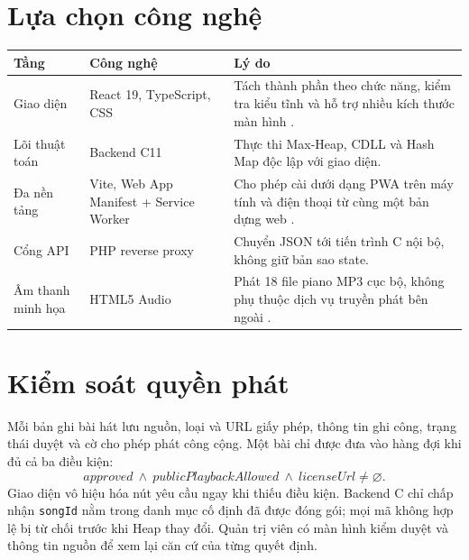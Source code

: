 \documentclass[12pt,a4paper,twoside,openright]{report}
\newcommand{\code}[1]{\texttt{#1}}
\begin{document}
\section{Lựa chọn công nghệ}
\begin{table}[h]\centering\small
\begin{tabularx}{\textwidth}{@{}p{3cm}p{3.6cm}X@{}}
\toprule
\textbf{Tầng} & \textbf{Công nghệ} & \textbf{Lý do}\\
\midrule
Giao diện & React 19, TypeScript, CSS & Tách thành phần theo chức năng, kiểm tra kiểu tĩnh
và hỗ trợ nhiều kích thước màn hình \cite{reactdocs}.\\
Lõi thuật toán & Backend C11 & Thực thi Max-Heap, CDLL và Hash Map độc lập với giao diện.\\
Đa nền tảng & Vite, Web App Manifest + Service Worker & Cho phép cài dưới dạng PWA trên
máy tính và điện thoại từ cùng một bản dựng web \cite{vitedocs}.\\
Cổng API & PHP reverse proxy & Chuyển JSON tới tiến trình C nội bộ, không giữ bản sao state.\\
Âm thanh minh họa & HTML5 Audio & Phát 18 file piano MP3 cục bộ, không phụ thuộc dịch vụ
truyền phát bên ngoài \cite{mdnaudio}.\\
\bottomrule
\end{tabularx}
\end{table}

\section{Kiểm soát quyền phát}
Mỗi bản ghi bài hát lưu nguồn, loại và URL giấy phép, thông tin ghi công, trạng thái duyệt
và cờ cho phép phát công cộng. Một bài chỉ
được đưa vào hàng đợi khi đủ cả ba điều kiện:
\[
approved \ \land\ publicPlaybackAllowed \ \land\ licenseUrl \ne \varnothing.
\]
Giao diện vô hiệu hóa nút yêu cầu ngay khi thiếu điều kiện. Backend C chỉ chấp nhận
\code{songId} nằm trong danh mục cố định đã được đóng gói; mọi mã không hợp lệ bị từ chối
trước khi Heap thay đổi. Quản trị viên có màn hình kiểm duyệt và thông tin nguồn để xem lại
căn cứ của từng quyết định.
\end{document}
